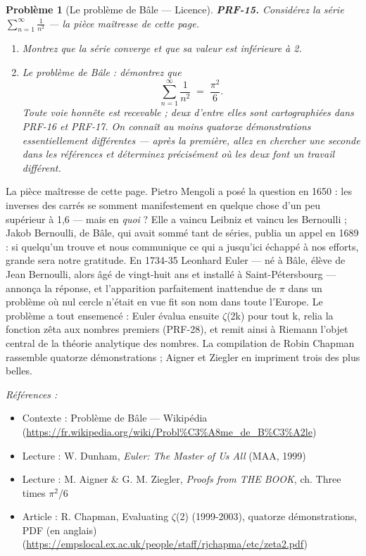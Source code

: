 \documentclass[11pt]{article}
\newtheorem{problem}{Problème}
\newenvironment{refs}{\par\small\noindent\emph{Références :}\begin{itemize}\setlength\itemsep{0pt}}{\end{itemize}\normalsize}
\begin{document}
\bigskip

\begin{problem}[{Le problème de Bâle --- Licence}]
\textbf{PRF-15.} Considérez la série $ \sum_{n=1}^{\infty} \frac{1}{n^2} $ ---
la pièce maîtresse de cette page.
\begin{enumerate}
\item[(a)] Montrez que la série converge et que sa valeur est inférieure à 2.
\item[(b)] Le problème de Bâle : démontrez que
\[ \sum_{n=1}^{\infty} \frac{1}{n^2} \;=\; \frac{\pi^2}{6}. \]
Toute voie honnête est recevable ; deux d'entre elles sont cartographiées dans PRF-16 et
PRF-17. On connaît au moins quatorze démonstrations essentiellement différentes --- après la
première, allez en chercher une seconde dans les références et déterminez précisément où
les deux font un travail différent.
\end{enumerate}

\end{problem}

\noindent La pièce maîtresse de cette page. Pietro Mengoli a posé la question en
1650 : les inverses des carrés se somment manifestement en quelque chose d'un peu supérieur
à 1,6 --- mais en \textit{quoi} ? Elle a vaincu Leibniz et vaincu les Bernoulli ; Jakob
Bernoulli, de Bâle, qui avait sommé tant de séries, publia un appel en 1689 : \og{} si quelqu'un
trouve et nous communique ce qui a jusqu'ici échappé à nos efforts, grande sera notre
gratitude. \fg{} En 1734-35 Leonhard Euler --- né à Bâle, élève de Jean Bernoulli, alors âgé de
vingt-huit ans et installé à Saint-Pétersbourg --- annonça la réponse, et l'apparition
parfaitement inattendue de $\pi$ dans un problème où nul cercle n'était en vue fit son nom dans
toute l'Europe. Le problème a tout ensemencé : Euler évalua ensuite $\zeta$(2k) pour tout k, relia
la fonction zêta aux nombres premiers (PRF-28), et remit ainsi à Riemann l'objet central de
la théorie analytique des nombres. La compilation de Robin Chapman rassemble quatorze
démonstrations ; Aigner et Ziegler en impriment trois des plus belles.

\begin{refs}
\item Contexte : Problème de Bâle --- Wikipédia (\url{https://fr.wikipedia.org/wiki/Probl%C3%A8me_de_B%C3%A2le})
\item Lecture : W. Dunham, \textit{Euler: The Master of Us All} (MAA, 1999)
\item Lecture : M. Aigner \& G. M. Ziegler, \textit{Proofs from THE BOOK}, ch. \og{} Three times $\pi$$^2$/6 \fg{}
\item Article : R. Chapman, \og{} Evaluating $\zeta$(2) \fg{} (1999-2003), quatorze démonstrations, PDF (en anglais) (\url{https://empslocal.ex.ac.uk/people/staff/rjchapma/etc/zeta2.pdf})
\end{refs}
\end{document}
